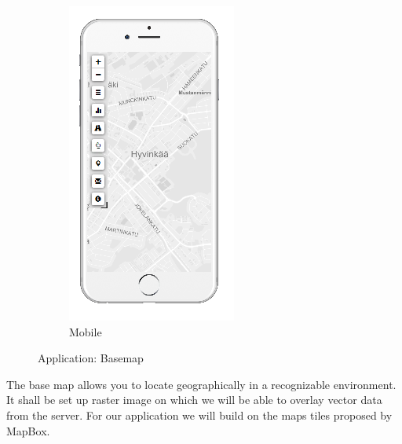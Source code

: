 \begin{figure}[ht]
\begin{subfigure}[b]{0.2\textwidth}
    \includegraphics[width=\textwidth]
      {img/c02-application/png/mobile-basemap.png}
    \caption{Mobile}
  \end{subfigure}
  \caption{Application: Basemap}
\end{figure}

The base map allows you to locate geographically in a recognizable environment. It shall be set up raster image on which we will be able to overlay vector data from the server. For our application we will build on the maps tiles proposed by MapBox.



